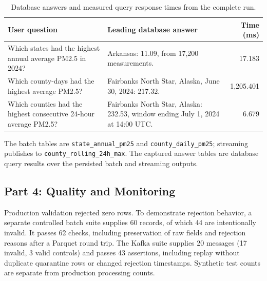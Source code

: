\documentclass[11pt,letterpaper]{article}
\begin{document}
\begin{table}[htbp]
\centering
\caption{Database answers and measured query response times from the complete run.}
\label{tab:answers}
\small
\begin{tabularx}{\linewidth}{@{}XXr@{}}
\toprule
User question & Leading database answer & Time (ms) \\
\midrule
Which states had the highest annual average PM2.5 in 2024? &
Arkansas: 11.09, from 17,200 measurements. & 17.183 \\
Which county-days had the highest average PM2.5? &
Fairbanks North Star, Alaska, June 30, 2024: 217.32. & 1,205.401 \\
Which counties had the highest consecutive 24-hour average PM2.5? &
Fairbanks North Star, Alaska: 232.53, window ending July 1, 2024 at 14:00 UTC. & 6.679 \\
\bottomrule
\end{tabularx}
\end{table}

The batch tables are \texttt{state\_annual\_pm25} and
\texttt{county\_daily\_pm25}; streaming publishes to
\texttt{county\_rolling\_24h\_max}. The captured answer tables are database query results over the persisted
batch and streaming outputs.

\subsection{Part 4: Quality and Monitoring}
Production validation rejected zero rows. To demonstrate rejection behavior,
a separate controlled batch suite supplies 60 records, of which 44 are
intentionally invalid. It passes 62 checks, including preservation of raw fields
and rejection reasons after a Parquet round trip. The Kafka suite supplies 20
messages (17 invalid, 3 valid controls) and passes 43 assertions, including
replay without duplicate quarantine rows or changed rejection timestamps.
Synthetic test counts are separate from production processing counts.
\end{document}
